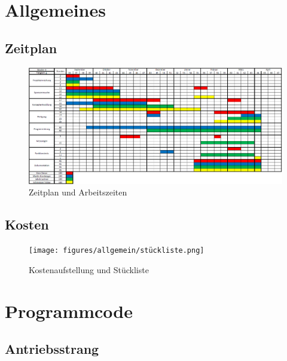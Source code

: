 \appendix
\chapter{Allgemeines}

\newpage

\section{Zeitplan}

\begin{figure} [H]
	\begin{center}
		\includegraphics[angle=90, scale=0.6] {figures/allgemein/zeitplan.png}
		\caption{Zeitplan und Arbeitszeiten}
		\label{fig:Zeitplan}
	\end{center}
\end{figure}

\newpage

\section{Kosten}


\begin{figure} [H]
	\begin{center}
		\texttt{[image: figures/allgemein/stückliste.png]}
		\caption{Kostenaufstellung und Stückliste}
		\label{fig:Stückliste}
	\end{center}
\end{figure}

\newpage

\chapter{Programmcode}

\section{Antriebsstrang}

